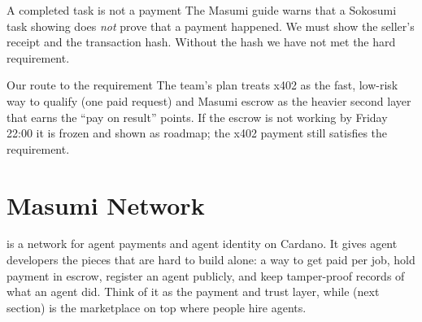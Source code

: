 \begin{center}
\end{center}

\begin{warningbox}{A completed task is not a payment}
The Masumi guide warns that a Sokosumi task showing  does \emph{not} prove that a payment happened. We must show the seller's receipt and the transaction hash. Without the hash we have not met the hard requirement.
\end{warningbox}

\begin{shelfiebox}{Our route to the requirement}
The team's plan treats x402 as the fast, low-risk way to qualify (one paid request) and Masumi escrow as the heavier second layer that earns the ``pay on result'' points. If the escrow is not working by Friday 22:00 it is frozen and shown as roadmap; the x402 payment still satisfies the requirement.
\end{shelfiebox}

\section{Masumi Network}

 is a network for agent payments and agent identity on Cardano. It gives agent developers the pieces that are hard to build alone: a way to get paid per job, hold payment in escrow, register an agent publicly, and keep tamper-proof records of what an agent did. Think of it as the payment and trust layer, while  (next section) is the marketplace on top where people hire agents.

